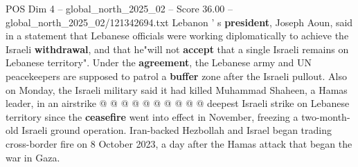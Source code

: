 \begin{textsample}{POS Dim 4 – global\_north\_2025\_02 – Score 36.00 – global\_north\_2025\_02/121342694.txt}
Lebanon ' s \textbf{president}, Joseph Aoun, said in a statement that Lebanese officials were working diplomatically to achieve the Israeli \textbf{withdrawal}, and that he"will not \textbf{accept} that a single Israeli remains on Lebanese territory".
Under the \textbf{agreement}, the Lebanese army and UN peacekeepers are supposed to patrol a \textbf{buffer} zone after the Israeli pullout.
Also on Monday, the Israeli military said it had killed Muhammad Shaheen, a Hamas leader, in an airstrike @ @ @ @ @ @ @ @ @ @ deepest Israeli strike on Lebanese territory since the \textbf{ceasefire} went into effect in November, freezing a two-month-old Israeli ground operation.
Iran-backed Hezbollah and Israel began trading cross-border fire on 8 October 2023, a day after the Hamas attack that began the war in Gaza.

\end{textsample}
